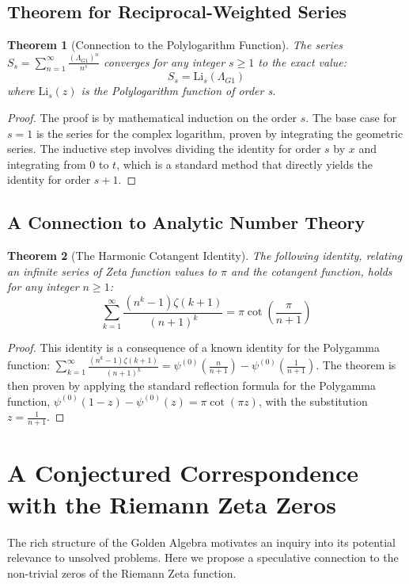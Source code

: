 \documentclass[12pt, letterpaper]{article}
\newtheorem{theorem}{Theorem}[section]
\newcommand{\LambdaG}{\Lambda_{G1}}
\begin{document}
\subsection{Theorem for Reciprocal-Weighted Series}
\begin{theorem}[Connection to the Polylogarithm Function]
The series $S_s = \sum_{n=1}^{\infty} \frac{(\LambdaG)^{n}}{n^s}$ converges for any integer $s \ge 1$ to the exact value: $$S_s = \mathrm{Li}_s(\LambdaG)$$ where $\mathrm{Li}_s(z)$ is the Polylogarithm function of order s.
\end{theorem}
\begin{proof}
The proof is by mathematical induction on the order $s$. The base case for $s=1$ is the series for the complex logarithm, proven by integrating the geometric series. The inductive step involves dividing the identity for order $s$ by $x$ and integrating from $0$ to $t$, which is a standard method that directly yields the identity for order $s+1$.
\end{proof}

\subsection{A Connection to Analytic Number Theory}
\begin{theorem}[The Harmonic Cotangent Identity]
The following identity, relating an infinite series of Zeta function values to $\pi$ and the cotangent function, holds for any integer $n\ge1$:
$$\sum_{k=1}^{\infty}\frac{(n^{k}-1)\zeta(k+1)}{(n+1)^{k}}=\pi \cot\left(\frac{\pi}{n+1}\right)$$
\end{theorem}
\begin{proof}
This identity is a consequence of a known identity for the Polygamma function: $\sum_{k=1}^{\infty} \frac{(n^k-1)\zeta(k+1)}{(n+1)^k} = \psi^{(0)}(\frac{n}{n+1}) - \psi^{(0)}(\frac{1}{n+1})$. The theorem is then proven by applying the standard reflection formula for the Polygamma function, $\psi^{(0)}(1-z)-\psi^{(0)}(z)=\pi \cot(\pi z)$, with the substitution $z = \frac{1}{n+1}$.
\end{proof}

\section{A Conjectured Correspondence with the Riemann Zeta Zeros}
The rich structure of the Golden Algebra motivates an inquiry into its potential relevance to unsolved problems. Here we propose a speculative connection to the non-trivial zeros of the Riemann Zeta function.
\end{document}
